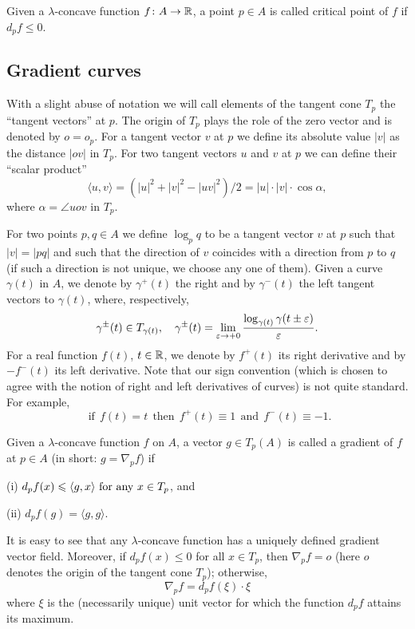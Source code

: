 \documentclass{amsart}
\begin{document}
\begin{defn} Given a $\lambda$-concave function $f\colon A \rightarrow {\Bbb R}$, a point $p\in A$
is called critical point of $f$ if $d_pf\le 0$.
\end{defn}


\subsection{Gradient curves}
With a slight abuse of notation we will call elements of the tangent cone $T_p$ the ``tangent vectors'' at $p$.
The origin of $T_p$ plays the role of the zero
vector and is denoted by $o=o_p$.
For a tangent vector $v$ at $p$ we define its absolute value $|v|$
as the distance $|ov|$ in $T_p$.
For two tangent vectors $u$ and $v$ at $p$ we can define
their ``scalar product''
$$\langle u, v\rangle=(|u|^2+|v|^2-|uv|^2)/2=|u|\cdot |v|\cdot \cos\alpha,$$ where $\alpha=\angle uov$ in $T_p$.

For two points $p,q\in A$ we define $\log_pq$ to be a tangent vector $v$
at $p$
such that $|v|=|pq|$ and such that the
direction of $v$ coincides with a direction from $p$ to $q$
(if such a direction is not unique, we choose any one of them).
Given a curve $\gamma(t)$ in $A$, we denote by $\gamma^+(t)$
the right and by
$\gamma^-(t)$ the left tangent vectors to  $\gamma(t)$, where, respectively,
$$\gamma^\pm(t)\in T_{\gamma(t)},\ \ \ \gamma^\pm(t)=\lim_{\varepsilon\to +0}\frac{\log_{\gamma(t)}\gamma(t\pm\varepsilon)}{\varepsilon}.$$
For a real function $f(t)$, $t\in {\Bbb R}$, we denote by  $f^+(t)$ its right derivative and by $-f^-(t)$ its left derivative. Note that our sign convention (which is chosen to agree with the notion of right and left derivatives of curves) is not quite standard. For example,
$$ \ \ \text{if}\ \ f(t)=t \ \ \text{then}\ \ f^+(t)\equiv 1 \ \ \text{and}\ \ f^-(t)\equiv -1.$$


\begin{defn}Given a $\lambda$-concave function $f$ on $A$,
a vector $g\in T_p(A)$ is called a gradient of $f$ at $p\in A$
(in short:  $g=\nabla_p f$) if

(i) $d_pf(x)\le \langle g , x\rangle\ \hbox{for any}\ x\in T_p$, and

(ii) $d_pf(g) = \langle g,g \rangle .$
\end{defn}


It is easy to see that any $\lambda$-concave function
has a uniquely defined gradient vector field.
Moreover, if $d_pf(x) \le 0$ for all $x\in T_p$,
then $\nabla_p f=o$
(here $o$ denotes the origin of the tangent cone $T_p$); otherwise,
 $$\nabla_p f=d_pf(\xi)\cdot  \xi$$
where $\xi$ is the (necessarily unique)
unit vector for which the function $d_pf$ attains its maximum.
\end{document}
